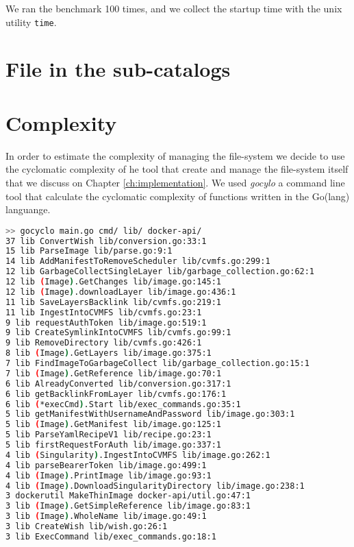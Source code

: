 We ran the benchmark 100 times, and we collect the startup time with the unix
utility \texttt{time}.

\section{File in the sub-catalogs}
\section{Complexity}

In order to estimate the complexity of managing the file-system we decide to
use the cyclomatic complexity of he tool that create and manage the file-system
itself that we discuss on Chapter \ref{ch:implementation}. We used
\textit{gocylo} \cite{gocylo} a command line tool that calculate the cyclomatic
complexity of functions written in the Go(lang) languange.

\begin{lstlisting}[language=bash,
    caption={Result of the cyclomatic complexity analysis, only function with complexity greater or equal to 3 are shown},label={lst:cyclomatic}]
>> gocyclo main.go cmd/ lib/ docker-api/
37 lib ConvertWish lib/conversion.go:33:1
15 lib ParseImage lib/parse.go:9:1
14 lib AddManifestToRemoveScheduler lib/cvmfs.go:299:1
12 lib GarbageCollectSingleLayer lib/garbage_collection.go:62:1
12 lib (Image).GetChanges lib/image.go:145:1
12 lib (Image).downloadLayer lib/image.go:436:1
11 lib SaveLayersBacklink lib/cvmfs.go:219:1
11 lib IngestIntoCVMFS lib/cvmfs.go:23:1
9 lib requestAuthToken lib/image.go:519:1
9 lib CreateSymlinkIntoCVMFS lib/cvmfs.go:99:1
9 lib RemoveDirectory lib/cvmfs.go:426:1
8 lib (Image).GetLayers lib/image.go:375:1
7 lib FindImageToGarbageCollect lib/garbage_collection.go:15:1
7 lib (Image).GetReference lib/image.go:70:1
6 lib AlreadyConverted lib/conversion.go:317:1
6 lib getBacklinkFromLayer lib/cvmfs.go:176:1
6 lib (*execCmd).Start lib/exec_commands.go:35:1
5 lib getManifestWithUsernameAndPassword lib/image.go:303:1
5 lib (Image).GetManifest lib/image.go:125:1
5 lib ParseYamlRecipeV1 lib/recipe.go:23:1
5 lib firstRequestForAuth lib/image.go:337:1
4 lib (Singularity).IngestIntoCVMFS lib/image.go:262:1
4 lib parseBearerToken lib/image.go:499:1
4 lib (Image).PrintImage lib/image.go:93:1
4 lib (Image).DownloadSingularityDirectory lib/image.go:238:1
3 dockerutil MakeThinImage docker-api/util.go:47:1
3 lib (Image).GetSimpleReference lib/image.go:83:1
3 lib (Image).WholeName lib/image.go:49:1
3 lib CreateWish lib/wish.go:26:1
3 lib ExecCommand lib/exec_commands.go:18:1
\end{lstlisting}

